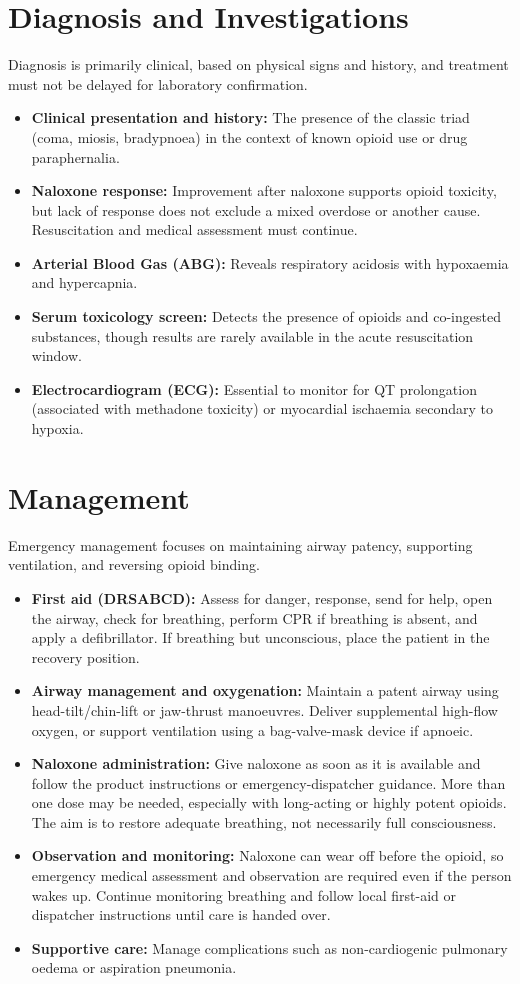 \section*{Diagnosis and Investigations}
Diagnosis is primarily clinical, based on physical signs and history, and treatment must not be delayed for laboratory confirmation.
\begin{itemize}
    \item \textbf{Clinical presentation and history:} The presence of the classic triad (coma, miosis, bradypnoea) in the context of known opioid use or drug paraphernalia.
    \item \textbf{Naloxone response:} Improvement after naloxone supports opioid toxicity, but lack of response does not exclude a mixed overdose or another cause. Resuscitation and medical assessment must continue.
    \item \textbf{Arterial Blood Gas (ABG):} Reveals respiratory acidosis with hypoxaemia and hypercapnia.
    \item \textbf{Serum toxicology screen:} Detects the presence of opioids and co-ingested substances, though results are rarely available in the acute resuscitation window.
    \item \textbf{Electrocardiogram (ECG):} Essential to monitor for QT prolongation (associated with methadone toxicity) or myocardial ischaemia secondary to hypoxia.
\end{itemize}

\section*{Management}
Emergency management focuses on maintaining airway patency, supporting ventilation, and reversing opioid binding.
\begin{itemize}
    \item \textbf{First aid (DRSABCD):} Assess for danger, response, send for help, open the airway, check for breathing, perform CPR if breathing is absent, and apply a defibrillator. If breathing but unconscious, place the patient in the recovery position.
    \item \textbf{Airway management and oxygenation:} Maintain a patent airway using head-tilt/chin-lift or jaw-thrust manoeuvres. Deliver supplemental high-flow oxygen, or support ventilation using a bag-valve-mask device if apnoeic.
    \item \textbf{Naloxone administration:} Give naloxone as soon as it is available and follow the product instructions or emergency-dispatcher guidance. More than one dose may be needed, especially with long-acting or highly potent opioids. The aim is to restore adequate breathing, not necessarily full consciousness.
    \item \textbf{Observation and monitoring:} Naloxone can wear off before the opioid, so emergency medical assessment and observation are required even if the person wakes up. Continue monitoring breathing and follow local first-aid or dispatcher instructions until care is handed over.
    \item \textbf{Supportive care:} Manage complications such as non-cardiogenic pulmonary oedema or aspiration pneumonia.
\end{itemize}

